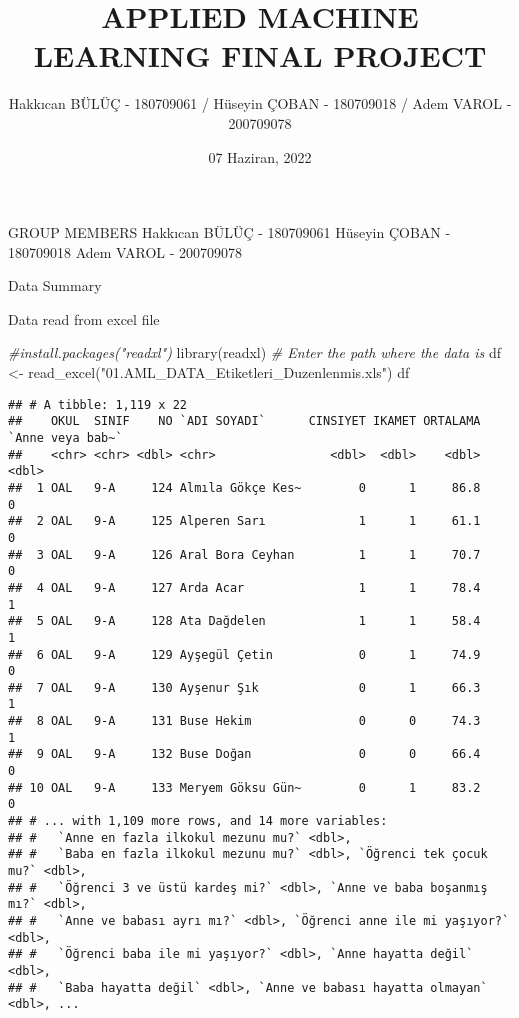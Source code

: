 \documentclass[
]{article}
\title{APPLIED MACHINE LEARNING FINAL PROJECT}
\subtitle{Hakkıcan BÜLÜÇ - 180709061 / Hüseyin ÇOBAN - 180709018 / Adem
VAROL - 200709078}
\author{}
\date{\vspace{-2.5em}07 Haziran, 2022}
\newenvironment{Shaded}{\begin{snugshade}}{\end{snugshade}}
\newcommand{\CommentTok}[1]{\textcolor[rgb]{0.56,0.35,0.01}{\textit{#1}}}
\newcommand{\FunctionTok}[1]{\textcolor[rgb]{0.00,0.00,0.00}{#1}}
\newcommand{\NormalTok}[1]{#1}
\newcommand{\OtherTok}[1]{\textcolor[rgb]{0.56,0.35,0.01}{#1}}
\newcommand{\StringTok}[1]{\textcolor[rgb]{0.31,0.60,0.02}{#1}}
\begin{document}
\maketitle

GROUP MEMBERS Hakkıcan BÜLÜÇ - 180709061 Hüseyin ÇOBAN - 180709018 Adem
VAROL - 200709078

Data Summary

Data read from excel file

\begin{Shaded}
\begin{Highlighting}[]
\CommentTok{\#install.packages("readxl")}
\FunctionTok{library}\NormalTok{(readxl)}
\CommentTok{\# Enter the path where the data is}
\NormalTok{df }\OtherTok{\textless{}{-}} \FunctionTok{read\_excel}\NormalTok{(}\StringTok{"01.AML\_DATA\_Etiketleri\_Duzenlenmis.xls"}\NormalTok{)}
\NormalTok{df}
\end{Highlighting}
\end{Shaded}

\begin{verbatim}
## # A tibble: 1,119 x 22
##    OKUL  SINIF    NO `ADI SOYADI`      CINSIYET IKAMET ORTALAMA `Anne veya bab~`
##    <chr> <chr> <dbl> <chr>                <dbl>  <dbl>    <dbl>            <dbl>
##  1 OAL   9-A     124 Almıla Gökçe Kes~        0      1     86.8                0
##  2 OAL   9-A     125 Alperen Sarı             1      1     61.1                0
##  3 OAL   9-A     126 Aral Bora Ceyhan         1      1     70.7                0
##  4 OAL   9-A     127 Arda Acar                1      1     78.4                1
##  5 OAL   9-A     128 Ata Dağdelen             1      1     58.4                1
##  6 OAL   9-A     129 Ayşegül Çetin            0      1     74.9                0
##  7 OAL   9-A     130 Ayşenur Şık              0      1     66.3                1
##  8 OAL   9-A     131 Buse Hekim               0      0     74.3                1
##  9 OAL   9-A     132 Buse Doğan               0      0     66.4                0
## 10 OAL   9-A     133 Meryem Göksu Gün~        0      1     83.2                0
## # ... with 1,109 more rows, and 14 more variables:
## #   `Anne en fazla ilkokul mezunu mu?` <dbl>,
## #   `Baba en fazla ilkokul mezunu mu?` <dbl>, `Öğrenci tek çocuk mu?` <dbl>,
## #   `Öğrenci 3 ve üstü kardeş mi?` <dbl>, `Anne ve baba boşanmış mı?` <dbl>,
## #   `Anne ve babası ayrı mı?` <dbl>, `Öğrenci anne ile mi yaşıyor?` <dbl>,
## #   `Öğrenci baba ile mi yaşıyor?` <dbl>, `Anne hayatta değil` <dbl>,
## #   `Baba hayatta değil` <dbl>, `Anne ve babası hayatta olmayan` <dbl>, ...
\end{verbatim}
\end{document}
